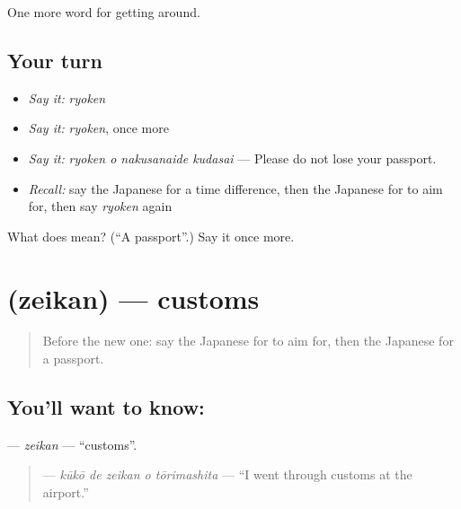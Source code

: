 \begin{grammarlens}[title={What you've built}]
One more word for getting around.
\end{grammarlens}

\subsection*{Your turn}
\begin{itemize}
\raggedright
  \item \emph{Say it:} \emph{ryoken}
  \item \emph{Say it:} \emph{ryoken}, once more
  \item \emph{Say it:} \emph{ryoken o nakusanaide kudasai} — Please do not lose your passport.
  \item \emph{Recall:} say the Japanese for a time difference, then the Japanese for to aim for, then say \emph{ryoken} again
\end{itemize}

\begin{tcolorbox}[breakable,colback=teal!4,colframe=teal!35!black,title={Before you move on}]
What does  mean? (\textquotedblleft{}A passport\textquotedblright{}.) Say it once more.
\end{tcolorbox}
\section[\texorpdfstring{\ja{ぜいかん} (zeikan)}{ぜいかん (zeikan)}]{ (zeikan) — customs}

\label{lesson:JA-C386-zeikan}



\begin{quote}
Before the new one: say the Japanese for to aim for, then the Japanese for a passport.
\end{quote}

\subsection*{You'll want to know: }
\textbf{} — \emph{zeikan} — \textquotedblleft{}customs\textquotedblright{}.

\begin{quote}
\textbf{  } — \emph{kūkō de zeikan o tōrimashita} — \textquotedblleft{}I went through customs at the airport.\textquotedblright{}
\end{quote}

